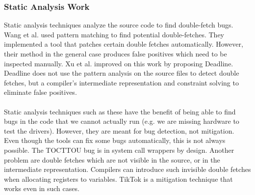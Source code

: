 \subsubsection{Static Analysis Work}
\label{subsec:dfstatic}
Static analysis techniques analyze the source code to find double-fetch bugs. Wang et al. \cite{wang2017double} used pattern matching to find potential double-fetches. They
implemented a tool that patches certain double fetches automatically. However, their method in the general case produces false positives which need to be inspected manually. 
Xu et al.\cite{xu2018precise} improved on this work by proposing Deadline. Deadline does not use the pattern analysis on the source files
to detect double fetches, but a compiler's intermediate representation and constraint solving to eliminate false positives.
\\
\\
Static analysis techniques such as these have the benefit of being able to find bugs in the code that we cannot actually run (e.g. we are missing hardware to test the drivers).
However, they are meant for bug detection, not mitigation. Even though the tools can fix some bugs automatically, this is not always possible.
The TOCTTOU bug is in system call wrappers by design. Another problem are double fetches which are not visible in the source, or in the intermediate representation.
Compilers can introduce such invisible double fetches when allocating registers to variables. TikTok is a mitigation technique that works even in such cases.
\\
\\

